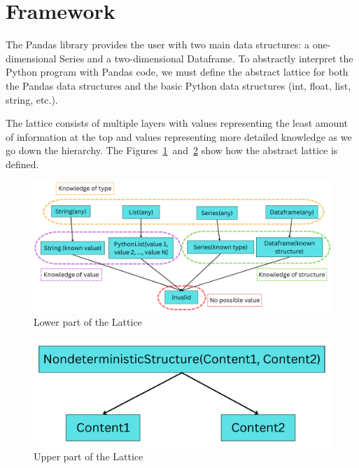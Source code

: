 \section{Framework}\label{sec:framework}
The Pandas library provides the user with two main data structures:
a one-dimensional Series and a two-dimensional Dataframe.
To abstractly interpret the Python program with Pandas code, we must define the abstract lattice for both the
Pandas data structures and the basic Python data structures (int, float, list, string, etc.).

The lattice consists of multiple layers with values representing the least amount of information at the top and values
representing more detailed knowledge as we go down the hierarchy.
The Figures~\ref{fig:hierarchy}~and~\ref{fig:upper_part} show how the abstract lattice is defined.

\vspace{-1em} %


\begin{figure}[H]
    \caption{Lower part of the Lattice}
    \label{fig:hierarchy}
    \centering
    \includegraphics[scale=0.3]{splash_abstract/img/hier}
\end{figure}

\vspace{-2em} %

\begin{figure}[H]
    \caption{Upper part of the Lattice}
    \label{fig:upper_part}
    \centering
    \includegraphics[scale=0.3]{poster/img/nondeterm}
\end{figure}

